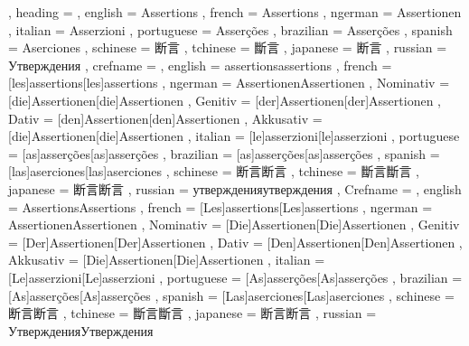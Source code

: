   {
    , heading =   {
                    , english     = Assertions
                    , french      = Assertions
                    , ngerman     = Assertionen
                    , italian     = Asserzioni
                    , portuguese  = Asserções
                    , brazilian   = Asserções
                    , spanish     = Aserciones
                    , schinese    = 断言
                    , tchinese    = 斷言
                    , japanese    = 断言
                    , russian     = Утверждения
                  }
    , crefname =  {
                    , english     = {assertions}{assertions}
                    , french      = [les]{assertions}[les]{assertions}
                    , ngerman     = { {Assertionen}{Assertionen}
                                      , Nominativ = [die]{Assertionen}[die]{Assertionen}
                                      , Genitiv   = [der]{Assertionen}[der]{Assertionen}
                                      , Dativ     = [den]{Assertionen}[den]{Assertionen}
                                      , Akkusativ = [die]{Assertionen}[die]{Assertionen}
                                    }
                    , italian     = [le]{asserzioni}[le]{asserzioni}
                    , portuguese  = [as]{asserções}[as]{asserções}
                    , brazilian   = [as]{asserções}[as]{asserções}
                    , spanish     = [las]{aserciones}[las]{aserciones}
                    , schinese    = {断言}{断言}
                    , tchinese    = {斷言}{斷言}
                    , japanese    = {断言}{断言}
                    , russian     = {утверждения}{утверждения}
                  }
    , Crefname =  {
                    , english     = {Assertions}{Assertions}
                    , french      = [Les]{assertions}[Les]{assertions}
                    , ngerman     = { {Assertionen}{Assertionen}
                                      , Nominativ = [Die]{Assertionen}[Die]{Assertionen}
                                      , Genitiv   = [Der]{Assertionen}[Der]{Assertionen}
                                      , Dativ     = [Den]{Assertionen}[Den]{Assertionen}
                                      , Akkusativ = [Die]{Assertionen}[Die]{Assertionen}
                                    }
                    , italian     = [Le]{asserzioni}[Le]{asserzioni}
                    , portuguese  = [As]{asserções}[As]{asserções}
                    , brazilian   = [As]{asserções}[As]{asserções}
                    , spanish     = [Las]{aserciones}[Las]{aserciones}
                    , schinese    = {断言}{断言}
                    , tchinese    = {斷言}{斷言}
                    , japanese    = {断言}{断言}
                    , russian     = {Утверждения}{Утверждения}
                  }
  }

